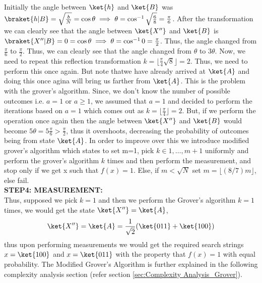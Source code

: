 \documentclass[12pt, oneside]{book}
\theoremstyle{definition}
\theoremstyle{definition}
\theoremstyle{remark}
\begin{document}
Initially the angle between $\ket{h}$ and $\ket{B}$ was $\braket{h|B}=\sqrt{\frac{b}{N}}=\cos \theta \implies \theta = \cos^{-1} \sqrt{\frac{6}{8}}=\frac{\pi}{6}$. After the transformation we can clearly see that the angle between $\ket{X''}$ and $\ket{B}$ is $\braket{X''|B}=0=\cos \theta \implies \theta = \cos^{-1} 0 = \frac{\pi}{2}$. Thus, the angle changed from $\frac{\pi}{6}$ to $\frac{\pi}{2}$. Thus, we can clearly see that the angle changed from $\theta$ to $3\theta$. Now, we need to repeat this reflection transformation $k=\lfloor \frac{\pi}{4}\sqrt{8}\rfloor = 2$. Thus, we need to perform this once again. But note thatwe have already arrived at $\ket{A}$ and doing this once agina will bring us farther from $\ket{A}$. This is the problem with the grover's algorithm. Since, we don't know the number of possible outcomes i.e. $a=1$ or $a \geq 1$, we assumed that $a=1$ and decided to perform the iterations based on $a=1$ which comes out as $k=\lfloor \frac{\pi}{4}\rfloor=2$. But, if we perform the operation once again then the angle between $\ket{X''}$ and $\ket{B}$ would become $5\theta=5\frac{\pi}{6} > \frac{\pi}{2}$, thus it overshoots, decreasing the probability of outcomes being from state $\ket{A}$. In order to improve over this we introduce modified grover's algorithm which states to set m=1, pick $k\in1,\ldots, m+1$ uniformly  and perform the grover's algorithm $k$ times and then perform the measurement, and stop only if we get x such that $f(x)=1$. Else, if $m<\sqrt{N}$ set $m=\lfloor (8/7)m\rfloor$, else fail.\\
\textbf{STEP4: MEASUREMENT: }\\
Thus, supposed we pick $k=1$ and then we perform the Grover's algorithm $k=1$ times, we would get the state $\ket{X''}=\ket{A}$,
\[
\ket{X''}=\ket{A}=\frac{1}{\sqrt{2}}(\ket{011}+\ket{100})
\]
thus upon performing measurements we would get the required search strings $x=\ket{100}$ and $x=\ket{011}$ with the property that $f(x)=1$ with equal probability. The Modified Grover's Algorithm is further explained in the following complexity analysis section (refer section \ref{sec:Complexity Analysis_Grover}).
\end{document}
